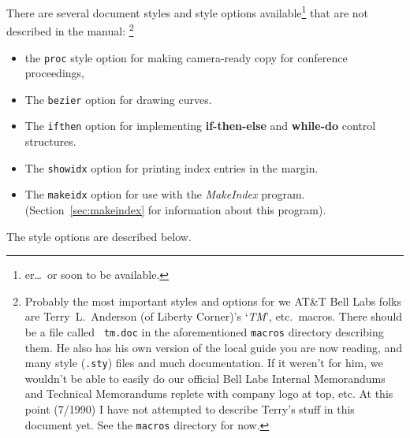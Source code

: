 There are several document styles and style options available\footnote{
er\ldots\ or soon to be available.  } that are not described in the
manual: \footnote{Probably the most important styles and options for
we AT\&T Bell Labs folks are Terry~L.~Anderson (of Liberty Corner)'s
`{\em TM\/}', etc.\ macros.  There should be a file called {\tt
tm.doc} in the aforementioned {\tt macros} directory describing them.
He also has his own version of the local guide you are now reading,
and many style ({\tt .sty}) files and much documentation.  If it
weren't for him, we wouldn't be able to easily do our official Bell
Labs Internal Memorandums and Technical Memorandums replete with
company logo at top, etc.  At this point (7/1990) I have not attempted
to describe Terry's stuff in this document yet.  See the {\tt macros}
directory for now.  }
\begin{itemize}
\item the \mbox{\tt proc} style option for making camera-ready copy for
conference proceedings,

\item The {\tt bezier} option for drawing curves.

\item The {\tt ifthen} option for implementing {\bf if-then-else} and
{\bf while-do} control structures.


\item The {\tt showidx} option for printing index entries in the
margin.

\item The {\tt makeidx} option for use with the {\it MakeIndex\/}
program. (Section~\ref{sec:makeindex} for information about this
program).

%
%
%
\end{itemize}
The style options are described below.


